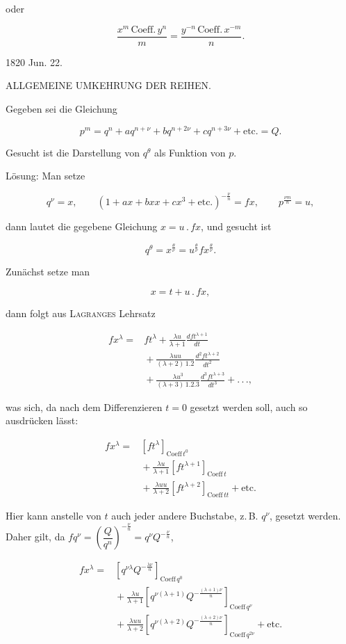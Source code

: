 \noindent oder

\[
\frac{x^m\,\text{Coeff.}\,y^n}{m} = \frac{y^{-n}\,\text{Coeff.}\,x^{-m}}{n}.
\]

1820 Jun. 22.



\begin{center}
ALLGEMEINE UMKEHRUNG DER REIHEN.
\end{center}

\noindent\hspace*{\parindent}Gegeben sei die Gleichung

\[
p^m = q^n+aq^{n+\nu}+bq^{n+2\nu}+cq^{n+3\nu}+\text{etc.} = Q.
\]

\noindent Gesucht ist die Darstellung von $q^\theta$ als Funktion von $p$.

Lösung: Man setze

\[
q^\nu = x,\qquad (1+ax+bxx+cx^3+\text{etc.})^{-\frac{\nu}{n}} = fx,\qquad p^{\frac{\nu m}{n}} = u,
\]

\noindent dann lautet die gegebene Gleichung $x = u\,.\,fx$, und gesucht ist

\[
q^\theta = x^{\frac{\theta}{\nu}} = u^{\frac{\theta}{\nu}}fx^{\frac{\theta}{\nu}}.
\]

Zunächst setze man

\[
x = t+u\,.\,fx,
\]

\noindent dann folgt aus \textsc{Lagranges} Lehrsatz

\[
\begin{aligned}fx^\lambda ={}& ft^\lambda + \frac{\lambda u}{\lambda+1}\frac{dft^{\lambda+1}}{dt} \\ &{}+ \frac{\lambda uu}{(\lambda+2)\,1.2}\frac{d^2ft^{\lambda+2}}{dt^2} \\ &{}+ \frac{\lambda u^3}{(\lambda+3)\,1.2.3}\frac{d^3ft^{\lambda+3}}{dt^3}+.\,.\,.,
\end{aligned}
\]

\noindent was sich, da nach dem Differenzieren $t=0$ gesetzt werden soll, auch so ausdrücken lässt:

\[
\begin{aligned}fx^\lambda ={}& [ft^\lambda]_{\text{Coeff}\,t^0}\\ &{}+ \frac{\lambda u}{\lambda+1}[ft^{\lambda+1}]_{\text{Coeff}\,t}\\ &{}+ \frac{\lambda uu}{\lambda+2}[ft^{\lambda+2}]_{\text{Coeff}\,tt}+\text{etc.}
\end{aligned}
\]

Hier kann anstelle von $t$ auch jeder andere Buchstabe, z.\,B. $q^\nu$, gesetzt werden. Daher gilt, da $fq^\nu = \left(\dfrac{Q}{q^n}\right)^{-\frac{\nu}{n}} = q^\nu Q^{-\frac{\nu}{n}}$,

\[
\begin{aligned}fx^\lambda ={}& \left[q^{\nu\lambda}Q^{-\frac{\lambda\nu}{n}}\right]_{\text{Coeff}\,q^0}\\ &{}+ \frac{\lambda u}{\lambda+1}\left[q^{\nu(\lambda+1)}Q^{-\frac{(\lambda+1)\nu}{n}}\right]_{\text{Coeff}\,q^\nu}\\ &{}+ \frac{\lambda uu}{\lambda+2}\left[q^{\nu(\lambda+2)}Q^{-\frac{(\lambda+2)\nu}{n}}\right]_{\text{Coeff}\,q^{2\nu}}+\text{etc.}
\end{aligned}
\]

